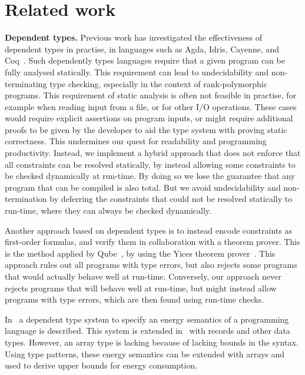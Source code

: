 \newcommand{\slicepatterns}{\url{https://blog.rust-lang.org/2018/05/10/Rust-1.26.html\#basic-slice-patterns}}
\newcommand{\subslicepatterns}{\url{https://blog.rust-lang.org/2020/03/12/Rust-1.42.html\#subslice-patterns}}
\newcommand{\listpatterns}{\url{https://learn.microsoft.com/dotnet/csharp/language-reference/operators/patterns\#list-patterns}}

\section{Related work}

\textbf{Dependent types.}
Previous work has investigated the effectiveness of dependent types in practise, in languages such as Agda, Idris, Cayenne, and Coq~\cite{agda, idris, cayenne, coq}.
Such dependently types languages require that a given program can be fully analysed statically.
This requirement can lead to undecidability and non-terminating type checking, especially in the context of rank-polymorphic programs.
This requirement of static analysis is often not feasible in practise, for example when reading input from a file, or for other I/O operations.
These cases would require explicit assertions on program inputs, or might require additional proofs to be given by the developer to aid the type system with proving static correctness.
This undermines our quest for readability and programming productivity.
Instead, we implement a hybrid approach that does not enforce that all constraints can be resolved statically, by instead allowing some constraints to be checked dynamically at run-time.
By doing so we lose the guarantee that any program that can be compiled is also total.
But we avoid undecidability and non-termination by deferring the constraints that could not be resolved statically to run-time, where they can always be checked dynamically.

Another approach based on dependent types is to instead encode constraints as first-order formulas, and verify them in collaboration with a theorem prover.
This is the method applied by Qube~\cite{qube}, by using the Yices theorem prover~\cite{yices}.
This approach rules out all programs with type errors, but also rejects some programs that would actually behave well at run-time.
Conversely, our approach never rejects programs that will behave well at run-time, but might instead allow programs with type errors, which are then found using run-time checks.

In~\cite{DBLP:conf/fopara/GastelKE15} a dependent type system to specify an energy semantics of a programming language is described.
This system is extended in~\cite{DBLP:journals/corr/GastelE17} with records and other data types.
However, an array type is lacking because of lacking bounds in the syntax.
Using type patterns, these energy semantics can be extended with arrays and used to derive upper bounds for energy consumption.


